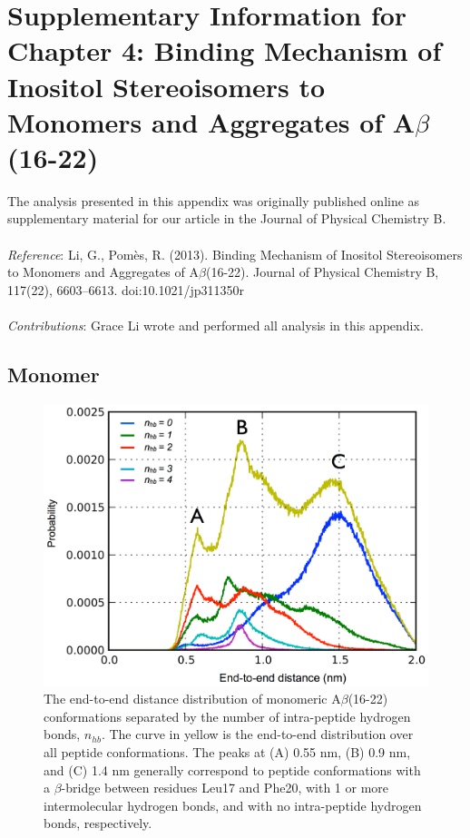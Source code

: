 
\chapter[Supplementary Information for Chapter 4]{Supplementary Information for Chapter 4: Binding Mechanism of Inositol Stereoisomers to Monomers and Aggregates of A$\beta$(16-22)}

The analysis presented in this appendix was originally published online as supplementary material for our article in the Journal of Physical Chemistry B. 
\\
\\
\emph{Reference}:
Li, G., Pom\`{e}s, R. (2013). Binding Mechanism of Inositol Stereoisomers to Monomers and Aggregates of A$\beta$(16-22). Journal of Physical Chemistry B, 117(22), 6603–6613. doi:10.1021/jp311350r
\\
\\
\emph{Contributions}: 
Grace Li wrote and performed all analysis in this appendix.

\newpage

\section{Monomer}

\begin{figure}[ht]
\centering
\includegraphics[width=14cm]{figures/appendixA/inos2_figures_SI_monomer_eed_by_hbonds.pdf}
\caption[The end-to-end distance distribution of monomeric A$\beta$(16-22) conformations separated by the number of intra-peptide hydrogen bonds, $n_{hb}$.]{The end-to-end distance distribution of monomeric A$\beta$(16-22) conformations separated by the number of intra-peptide hydrogen bonds, $n_{hb}$. The curve in yellow is the end-to-end distribution over all peptide conformations. The peaks at (A) 0.55 nm, (B) 0.9 nm, and (C) 1.4 nm generally correspond to peptide conformations with a $\beta$-bridge between residues Leu17 and Phe20, with 1 or more intermolecular hydrogen bonds, and with no intra-peptide hydrogen bonds, respectively.}
\label{fig:SI-monomersEedByHbonds}
\end{figure}

